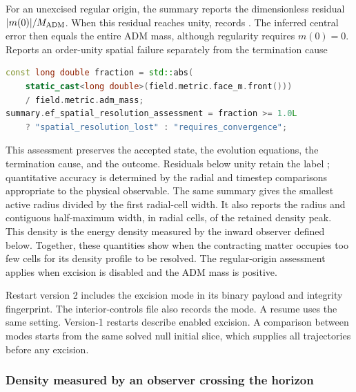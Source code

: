 For an unexcised regular origin, the summary reports the dimensionless
residual \( |m(0)|/M_{\rm ADM} \). When this residual reaches unity,
 records
. The inferred central error then equals
the entire ADM mass, although regularity requires \(m(0)=0\).
{}
{Reports an order-unity spatial failure separately from the termination cause}
\begin{lstlisting}[language=C++,basicstyle=\ttfamily\scriptsize]
const long double fraction = std::abs(
    static_cast<long double>(field.metric.face_m.front()))
    / field.metric.adm_mass;
summary.ef_spatial_resolution_assessment = fraction >= 1.0L
    ? "spatial_resolution_lost" : "requires_convergence";
\end{lstlisting}
This assessment preserves the accepted state, the evolution equations,
the termination cause, and the 
outcome. Residuals below unity retain the label
; quantitative accuracy is determined by the
radial and timestep comparisons appropriate to the physical observable.
The same summary gives the smallest active radius divided by the first
radial-cell width. It also reports the radius and contiguous half-maximum
width, in radial cells, of the retained density peak. This density is the
energy density measured by the inward observer defined below. Together,
these quantities show when the contracting matter occupies too few cells
for its density profile to be resolved. The regular-origin assessment
applies when excision is disabled and the ADM mass is positive.

Restart version 2 includes the excision mode in its binary payload and
integrity fingerprint. The interior-controls file also records the mode.
A resume uses the same setting. Version-1 restarts describe enabled excision.
A comparison between modes starts from the same solved null initial slice,
which supplies all trajectories before any excision.


\subsubsection{Density measured by an observer crossing the horizon}
\label{sec:ef-interior-density}

